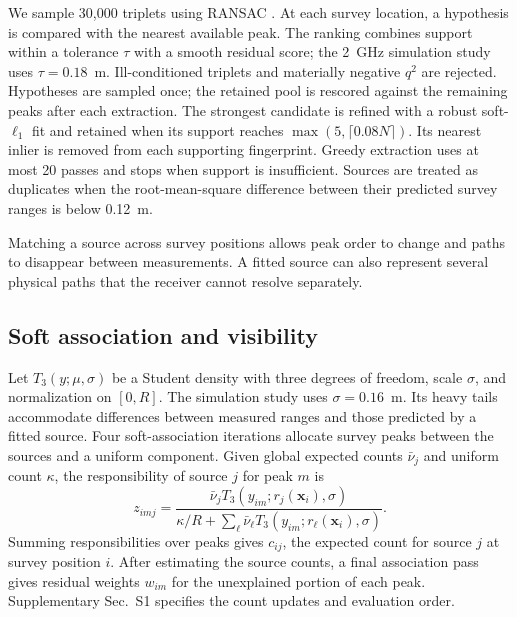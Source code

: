 \documentclass[conference]{IEEEtran}
\begin{document}
We sample 30,000 triplets using RANSAC \cite{fischler1981ransac}. At each survey location, a hypothesis is compared with the nearest available peak. The ranking combines support within a tolerance \(\tau\) with a smooth residual score; the 2~GHz simulation study uses \(\tau=0.18\)~m. Ill-conditioned triplets and materially negative \(q^2\) are rejected. Hypotheses are sampled once; the retained pool is rescored against the remaining peaks after each extraction. The strongest candidate is refined with a robust soft-\(\ell_1\) fit and retained when its support reaches \(\max(5,\lceil0.08N\rceil)\). Its nearest inlier is removed from each supporting fingerprint. Greedy extraction uses at most 20 passes and stops when support is insufficient. Sources are treated as duplicates when the root-mean-square difference between their predicted survey ranges is below 0.12~m.

Matching a source across survey positions allows peak order to change and paths to disappear between measurements. A fitted source can also represent several physical paths that the receiver cannot resolve separately.

\subsection{Soft association and visibility}
Let \(T_3(y;\mu,\sigma)\) be a Student density with three degrees of freedom, scale \(\sigma\), and normalization on \([0,R]\). The simulation study uses \(\sigma=0.16\)~m. Its heavy tails accommodate differences between measured ranges and those predicted by a fitted source. Four soft-association iterations allocate survey peaks between the sources and a uniform component. Given global expected counts \(\bar\nu_j\) and uniform count \(\kappa\), the responsibility of source \(j\) for peak \(m\) is
\begin{equation}
z_{imj}=\frac{\bar\nu_jT_3(y_{im};r_j(\bm x_i),\sigma)}
{\kappa/R+\sum_\ell\bar\nu_\ell T_3(y_{im};r_\ell(\bm x_i),\sigma)}.
\label{eq:responsibility}
\end{equation}
Summing responsibilities over peaks gives $c_{ij}$, the expected count for source $j$ at survey position $i$. After estimating the source counts, a final association pass gives residual weights $w_{im}$ for the unexplained portion of each peak. Supplementary Sec.~S1 specifies the count updates and evaluation order.
\end{document}
